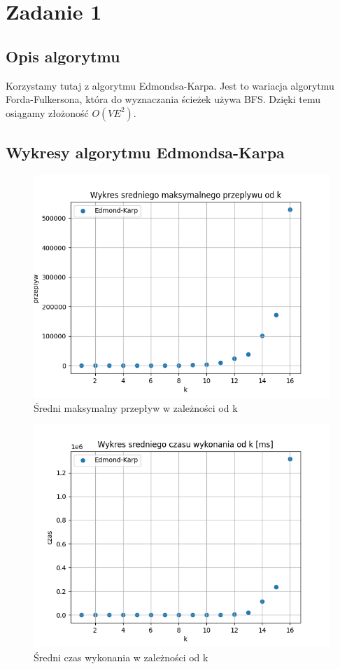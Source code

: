 \documentclass{report}
\begin{document}
\author{Jakub Ogrodowczyk}

\section*{Zadanie 1}
\subsection*{Opis algorytmu}
Korzystamy tutaj z algorytmu Edmondsa-Karpa. Jest to wariacja
algorytmu Forda-Fulkersona, która do wyznaczania ścieżek
używa BFS. Dzięki temu osiągamy złożoność $O(VE^2)$.
\subsection*{Wykresy algorytmu Edmondsa-Karpa}
\begin{figure}[H]
    \centering
    \includegraphics[scale=0.55]{../ex1_and_4/plots/karp_maxflow.png}
    \caption{Średni maksymalny przepływ w zależności od k}
\end{figure}
\begin{figure}[H]
    \centering
    \includegraphics[scale=0.55]{../ex1_and_4/plots/karp_time.png}
    \caption{Średni czas wykonania w zależności od k}
\end{figure}
\end{document}
